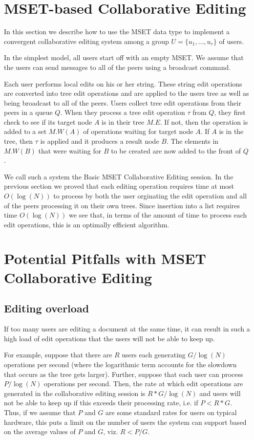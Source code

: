 \documentclass{amsart}
\begin{document}
\section{MSET-based Collaborative Editing}
\label{sec:collabed}
In this section we describe how to use the MSET data type to implement a convergent collaborative editing system among a group $U = \{u_1,\ldots,u_r\}$ of users.

In the simplest model, all users start off with an empty MSET. We assume that the users can send messages to all of the peers using a broadcast command. 

Each user performs local edits on his or her string. These string edit operations are converted into tree edit operations and are applied to the users tree as well as being broadcast to all of the peers.  Users collect tree edit operations from their peers in a queue $Q$. When they process a tree edit operation $\tau$ from $Q$, they first check to see if its target node $A$ is in their tree $M.E$.  If not, then the operation is added to a set $M.W(A)$ of operations waiting for target node $A$.  If $A$ is in the tree, then $\tau$ is applied and it produces a result node $B$. The elements in $M.W(B)$ that were waiting for $B$ to be created are now added to the front of $Q$.

We call such a system the Basic MSET Collaborative Editing session. In the previous section we proved that each editing operation requires time at most $O(\log(N))$ to process by both the user orginating the edit operation and all of the peers processing it on their own trees.  Since insertion into a list requires time $O(\log(N))$ we see that, in terms of the amount of time to process each edit operations, this is an optimally efficient algorithm.

\section{Potential Pitfalls with MSET Collaborative Editing}
\label{sec:pitfalls}

\subsection{Editing overload}
If too many users are editing a document at the same time, it can result in such a high load of edit operations that the users will not be able to keep up.

For example, suppose that there are $R$ users each generating $G/\log(N)$ operations per second (where the logarithmic term accounts for the slowdown that occurs as the tree gets larger). Further, suppose that each user can process $P/\log(N)$ operations per second. Then, the rate at which edit operations are generated in the collaborative editing session is $R*G/\log(N)$ and users will
not be able to keep up if this exceeds their processing rate, i.e. if $P<R*G$.
Thus, if we assume that $P$ and $G$ are some standard rates for users on
typical hardware, this puts a limit on the number of users the system can support based on the average values of $P$ and $G$, viz. $R < P/G$.
\end{document}
